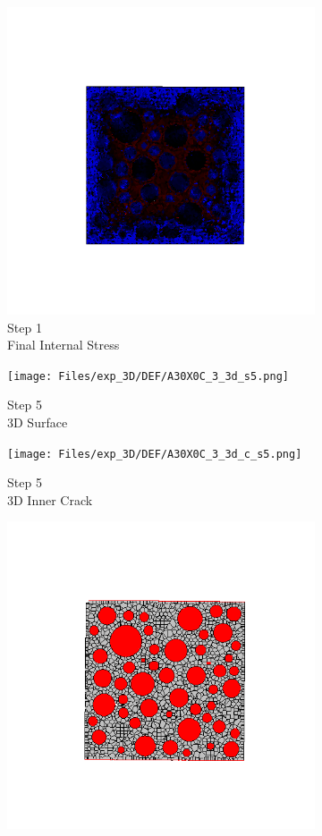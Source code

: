 \begin{figure}[ht!]
    \begin{subfigure}{.25\textwidth}
      \centering
      \includegraphics[width=.8\linewidth]{Files/exp_3D/DEF/A30X0C_3_s1.png}
      \caption{Step 1\\Final Internal Stress}
    \end{subfigure}
    \begin{subfigure}{.25\textwidth}
      \centering
      \texttt{[image: Files/exp\_3D/DEF/A30X0C\_3\_3d\_s5.png]}
      \caption{Step 5\\3D Surface}
    \end{subfigure}%
    \begin{subfigure}{.25\textwidth}
      \centering
      \texttt{[image: Files/exp\_3D/DEF/A30X0C\_3\_3d\_c\_s5.png]}
      \caption{Step 5\\3D Inner Crack}
    \end{subfigure}%
    \begin{subfigure}{.25\textwidth}
      \centering
      \includegraphics[width=.8\linewidth]{Files/exp_3D/DEF/A30X0C_3_c5.png}

\end{subfigure}
\end{figure}
